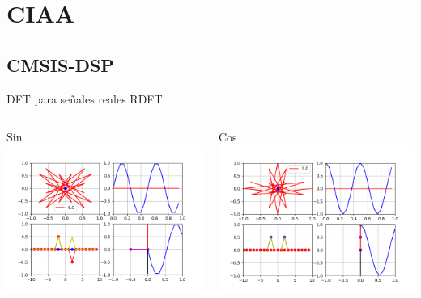 \section{CIAA}
\subsection{CMSIS-DSP}
\begin{frame}{DFT para señales reales RDFT}
   \begin{columns}[c]
      \begin{column}{.5\textwidth}
         Sin
         \centering\includegraphics[width=1.0\textwidth]{3_clase/euler_reales_sin}
      \end{column}
      \begin{column}{.5\textwidth}
         Cos
         \centering\includegraphics[width=1.0\textwidth]{3_clase/euler_reales_cos}
      \end{column}
   \end{columns}
\end{frame}
